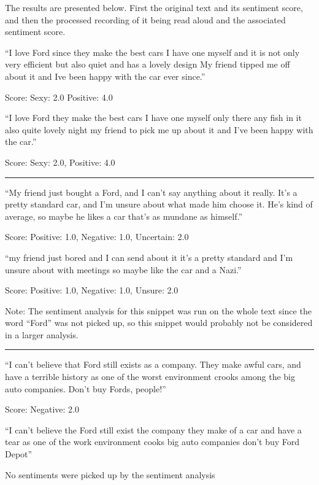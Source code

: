 \documentclass[a4paper,12pt,twoside]{ltxdoc}
\newcommand*\sepline{%
  \begin{center}
    \rule[1ex]{.5\textwidth}{.5pt}
  \end{center}}
\begin{document}
The results are presented below. First the original text and its sentiment score, and then the processed recording of it being read aloud and the associated sentiment score.

\begin{center}
``I love Ford since they make the best cars I have one myself and it is not only very efficient but also quiet and has a lovely design My friend tipped me off about it and Ive been happy with the car ever since.''
\end{center}
\hfill Score: Sexy: 2.0 Positive: 4.0

\begin{center}
``I love Ford they make the best cars I have one myself only there any fish in it also quite lovely night my friend to pick me up about it and I've been happy with the car.''
\end{center}
\hfill Score: Sexy: 2.0, Positive: 4.0

\sepline

\begin{center}
``My friend just bought a Ford, and I can't say anything about it really. It's a pretty standard car, and I'm unsure about what made him choose it. He's kind of average, so maybe he likes a car that's as mundane as himself.''
\end{center}
\hfill Score: Positive: 1.0, Negative: 1.0, Uncertain: 2.0

\begin{center}
``my friend just bored and I can send about it it's a pretty standard and I'm unsure about with meetings so maybe like the car and a Nazi.''
\end{center}
\hfill Score: Positive: 1.0, Negative: 1.0, Unsure: 2.0

Note: The sentiment analysis for this snippet was run on the whole text since the word ``Ford'' was not picked up, so this snippet would probably not be considered in a larger analysis.

\sepline

\begin{center}
``I can't believe that Ford still exists as a company. They make awful cars, and have a terrible history as one of the worst environment crooks among the big auto companies. Don't buy Fords, people!''
\end{center}
\hfill Score: Negative: 2.0

\begin{center}
``I can't believe the Ford still exist the company they make of a car and have a tear as one of the work environment cooks big auto companies don't buy Ford Depot''
\end{center}
\hfill No sentiments were picked up by the sentiment analysis
\end{document}
